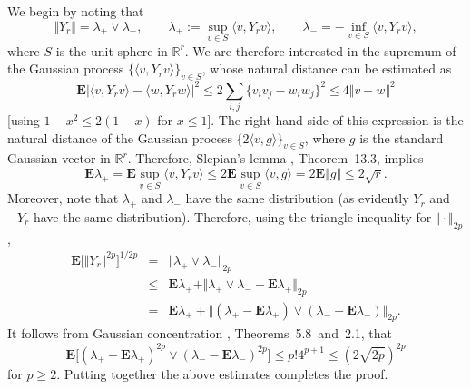 \documentclass[aop,MSNbibl,dvips]{arximspdf}
\newcommand{\rrvert}{\vert}
\newcommand{\rrVert}{\Vert}
\newcommand{\llvert}{\vert}
\newcommand{\llVert}{\Vert}
\newcommand{\EE}{\mathbf{E}}
\begin{document}
\begin{pf}
We begin by noting that
%
\[
\llVert Y_r\rrVert=\lambda_+\vee\lambda_-,\qquad\lambda_+:=\sup
_{v\in S}\langle v,Y_rv\rangle, \qquad\lambda_-=-\inf
_{v\in S}\langle v,Y_rv\rangle, %
\]
%
where $S$ is the unit sphere in $\mathbb{R}^r$. We are therefore
interested in the supremum of the Gaussian process $\{\langle
v,Y_rv\rangle\}_{v\in S}$, whose natural distance can be estimated as
%
\[
\EE\bigl\llvert\langle v,Y_rv\rangle-\langle w,Y_rw
\rangle\bigr\rrvert^2 \le2\sum_{i,j}
\{v_iv_j-w_iw_j\}^2
\le4\llVert v-w\rrVert^2 %
\]
%
[using $1-x^2\le2(1-x)$ for $x\le1$]. The right-hand side of this
expression is the
natural distance of the Gaussian process $\{2\langle v,g\rangle\}
_{v\in
S}$, where $g$ is the standard Gaussian vector in $\mathbb{R}^r$.
Therefore, Slepian's lemma \cite{BLM13}, Theorem~13.3, implies
%
\[
\EE\lambda_+ = \EE\sup_{v\in S}\langle v,Y_rv\rangle
\le2\EE\sup_{v\in S}\langle v,g\rangle= 2\EE\llVert g\rrVert\le2
\sqrt{r}. %
\]
%
Moreover, note that $\lambda_+$ and $\lambda_-$ have the same
distribution (as evidently $Y_r$ and $-Y_r$ have the same distribution).
Therefore, using the triangle inequality for $\llVert \cdot\rrVert _{2p}$,
%
\begin{eqnarray*}
\EE\bigl[\llVert Y_r\rrVert^{2p}\bigr]^{1/2p} &=&
\llVert\lambda_+\vee\lambda_-\rrVert_{2p}
\\
&\le&\EE\lambda_+ + \llVert\lambda_+\vee\lambda_- - \EE\lambda_+\rrVert
_{2p}
\\
& =& \EE\lambda_+ + \bigl\llVert(\lambda_+-\EE\lambda_+)\vee(\lambda
_--\EE
\lambda_-)\bigr\rrVert_{2p}.
\end{eqnarray*}
%
It follows from
Gaussian concentration \cite{BLM13}, Theorems~5.8~and~2.1, that
%
\[
\EE\bigl[(\lambda_+-\EE\lambda_+)^{2p}\vee(\lambda_- -\EE
\lambda_-)^{2p}\bigr] \le p!4^{p+1} \le(2\sqrt{2p})^{2p}
%
\]
%
for $p\ge2$. Putting together the above estimates completes the proof.
\end{pf}
\end{document}
